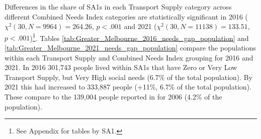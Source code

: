\documentclass[preprint, 3p,
authoryear]{elsarticle} %
\begin{document}
Differences in the share of SA1s in each Transport Supply category
across different Combined Needs Index categories are statistically
significant in 2016 (\(\chi^2(30, N = 9964) = 264.26\), \(p < .001\) and
2021 (\(\chi^2(30, N = 11138) = 133.51\), \(p < .001\))\footnote{See
  Appendix for tables by SA1.}. Tables
\ref{tab:Greater_Melbourne_2016_needs_gap_population} and
\ref{tab:Greater_Melbourne_2021_needs_gap_population} compare the
populations within each Transport Supply and Combined Needs Index
grouping for 2016 and 2021. In 2016 301,743 people lived within SA1s
that have Zero or Very Low Transport Supply, but Very High social needs
(6.7\% of the total population). By 2021 this had increased to 333,887
people (+11\%, 6.7\% of the total population). These compare to the
139,004 people reported in \citet{currie2010identifying} for 2006 (4.2\%
of the population).
\end{document}
